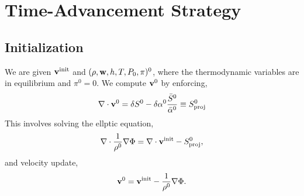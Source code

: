 \documentclass[final]{siamltex}
\def\vb {{\bf v}}
\def\wb {{\bf w}}
\begin{document}
\section{Time-Advancement Strategy}\label{Sec:Time-Advancement Strategy}

\subsection{Initialization}
We are given $\vb^{\rm init}$ and $(\rho,\wb,h,T,P_0,\pi)^0$,
where the thermodynamic variables are in equilibrium
and $\pi^0=0$.  We compute $\vb^0$ by enforcing,
\begin{equation}
\nabla\cdot\vb^0 = \delta S^0 - \delta\alpha^0\frac{\bar{S}^0}{\bar{\alpha}^0} \equiv S_{\rm proj}^0
\end{equation}
This involves solving the ellptic equation,
\begin{equation}
\nabla\cdot\frac{1}{\rho^0}\nabla\Phi = \nabla\cdot\vb^{\rm init} - S_{\rm proj}^0,
\end{equation}
and velocity update,
\begin{equation}
\vb^0 = \vb^{\rm init} - \frac{1}{\rho^0}\nabla\Phi.
\end{equation}
\end{document}
